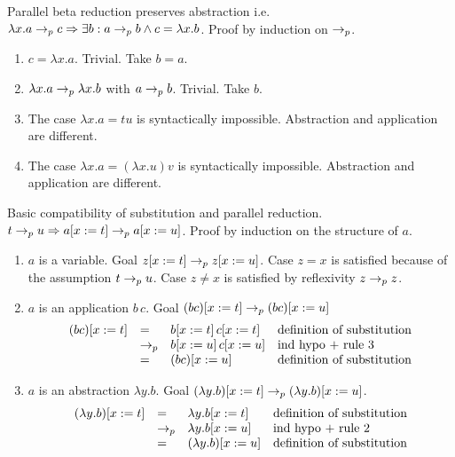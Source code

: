 \documentclass{article}
\begin{document}
\begin{lemma}
  Parallel beta reduction preserves abstraction i.e.
  $\lambda x.a \to_{p} c \Rightarrow \exists b : a \to_{p} b \land c = \lambda
  x.b$. Proof by induction on $\to_{p}$.
  \begin{enumerate}
  \item $c = \lambda x.a$. Trivial. Take $b = a$.
  \item $\lambda x.a \to_{p} \lambda x.b$ with $a \to_{p} b$. Trivial. Take $b$.
  \item The case $\lambda x.a = t u$ is syntactically impossible. Abstraction
    and application are different.
  \item The case $\lambda x.a = (\lambda x.u) v$ is syntactically
    impossible. Abstraction and application are different.
  \end{enumerate}
\end{lemma}


\begin{lemma}
  Basic compatibility of substitution and parallel reduction.
  $t \to_{p} u \Rightarrow a[x := t] \to_{p} a[x := u]$. Proof by induction on the
  structure of $a$.
  \begin{enumerate}
  \item $a$ is a variable. Goal $z[x := t] \to_{p} z[x := u]$. Case $z=x$
    is satisfied because of the assumption $t \to_{p} u$. Case $z\ne x$ is
    satisfied by reflexivity $z \to_{p} z$.
  \item
    $a$ is an application $b\, c$.
    Goal $(b c)[x:=t] \to_{p} (b c)[x:=u]$
    $$
    \begin{array}{llll}
      (b c)[x:=t] &=& b[x:=t]\, c[x:=t] &              \text{definition of substitution}\\
                      &\to_{p} & b[x:=u]\, c[x:=u] & \text{ind hypo + rule 3} \\
                      &=& (b c)[x:=u] &                       \text{definition of substitution}
    \end{array}
    $$
  \item
    $a$ is an abstraction $\lambda y.b$.
    Goal $(\lambda y.b)[x:=t] \to_{p} (\lambda y.b)[x:=u]$.
    $$
    \begin{array}{llll}
      (\lambda y.b)[x:=t] &=& \lambda y. b[x:=t]  &\text{definition of substitution}\\
      &\to_{p} & \lambda y.b[x:=u] &\text{ind hypo + rule 2} \\
      &=& (\lambda y.b)[x:=u] & \text{definition of substitution}
    \end{array}
    $$
  \end{enumerate}
\end{lemma}
\end{document}
